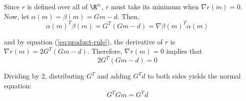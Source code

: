 \documentclass{homework}
\begin{document}
Since $r$ is defined over all of $\R^n$, $r$ must take its minimum when $\nabla r(m) = 0$.
Now, let $\alpha(m) = \beta(m) = Gm - d$. Then,
\begin{equation*}
    \alpha(m)^T \beta(m) = G^T( Gm - d)  = \nabla \beta(m)^T \alpha(m)
\end{equation*}

and by equation (\ref{eq:product-rule}), the derivative of $r$ is $\nabla r(m) = 2G^T( Gm - d)$. Therefore, $\nabla r(m) = 0$ implies that
\begin{equation*}
    2G^T(Gm-d) = 0
\end{equation*}

Dividing by 2, distributing $G^T$ and adding $G^Td$ to both sides yields the normal equation:
\begin{equation*}
    G^T G m = G^T d
\end{equation*}
\end{document}
